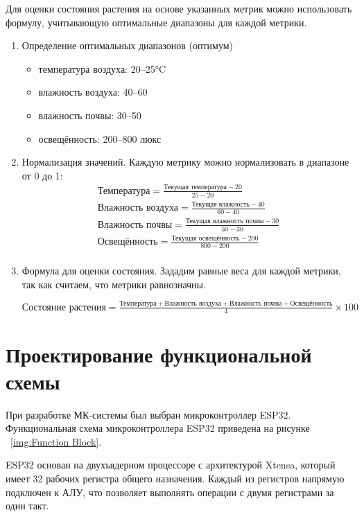 \documentclass{bmstu}
\begin{document}
    Для оценки состояния растения на основе указанных метрик можно использовать
    формулу, учитывающую оптимальные диапазоны для каждой метрики.
    \begin{enumerate}
        \item Определение оптимальных диапазонов (оптимум)
        \begin{itemize}
            \item температура воздуха: 20--25°C
            \item влажность воздуха: 40--60%
            \item влажность почвы: 30--50%
            \item освещённость: 200--800 люкс
        \end{itemize}
        \item Нормализация значений.
        Каждую метрику можно нормализовать в диапазоне от 0 до 1:
        \begin{gather*}
            \text{Температура} = \frac{\text{Текущая температура} - 20}{25 - 20}\\
            \text{Влажность воздуха}= \frac{\text{Текущая влажность} - 40}{60 - 40}\\
            \text{Влажность почвы}= \frac{\text{Текущая влажность почвы} - 30}{50 - 30}\\
            \text{Освещённость}= \frac{\text{Текущая освещённость} - 200}{800 - 200}\\
        \end{gather*}
        \item Формула для оценки состояния.
        Зададим равные веса для каждой метрики, так как считаем, что метрики равнозначны.

            {\small
        $\text{Состояние растения} = \frac{\text{Температура} + \text{Влажность воздуха} + \text{Влажность почвы} + \text{Освещённость}}{4} \times 100$
        }
    \end{enumerate}

    \section{Проектирование функциональной схемы}
    При разработке МК-системы был выбран микроконтроллер ESP32. Функциональная схема микроконтроллера ESP32 приведена на рисунке ~\ref{img:Function Block}.

    ESP32 основан на двухъядерном процессоре с архитектурой Xtensa, который имеет 32 рабочих регистра общего назначения. Каждый из регистров напрямую подключен к АЛУ, что позволяет выполнять операции с двумя регистрами за один такт.
\end{document}
